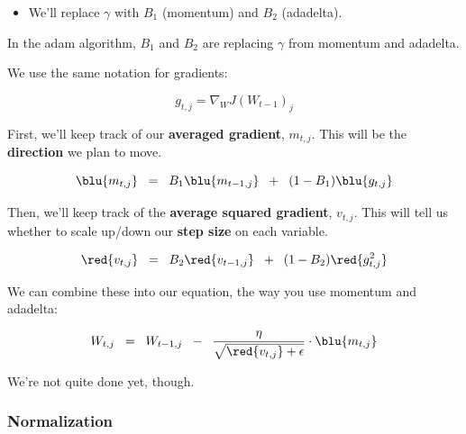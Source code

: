             \begin{itemize}
                \item We'll replace $\gamma$ with $B_1$ (momentum) and $B_2$ (adadelta).\\
            \end{itemize}

            \begin{notation}
                In the adam algorithm, $B_1$ and $B_2$ are  replacing $\gamma$ from momentum and adadelta.
            \end{notation}
    
            We use the same notation for gradients:
    
            \begin{equation}
                g_{t,j} = \nabla_W J(W_{t-1})_j
            \end{equation}
    
            First, we'll keep track of our\textbf{ averaged gradient}, $m_{t,j}$. This will be the \textbf{direction} we plan to move.

            \begin{equation}
                \blu{m_{t,j}} \;\;=\;\; 
                B_1 \blu{m_{t-1,j}} \;\;+\;\; 
                (1-B_1) \blu{ g_{t,j} }
            \end{equation}

            Then, we'll keep track of the \textbf{average squared gradient}, $v_{t,j}$. This will tell us whether to scale up/down our \textbf{step size} on each variable.

            \begin{equation}
                \red{v_{t,j}} \;\;=\;\; 
                B_2 \red{v_{t-1,j}} \;\;+\;\; 
                (1-B_2) \red{ g_{t,j}^2 }
            \end{equation}

            We can combine these into our equation, the way you use momentum and adadelta:

            \begin{equation}
                W_{t,j} \;\;=\;\; 
                W_{t-1,j}  \;\;-\;\; 
                \frac{\eta}{ \sqrt{\red{v_{t,j}}+\epsilon} } \cdot \blu{m_{t,j}}
            \end{equation}

            We're not quite done yet, though.

        \subsubsection{Normalization}

